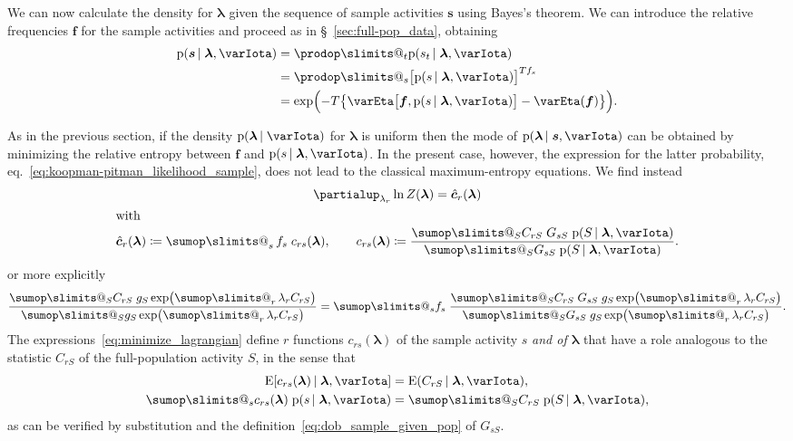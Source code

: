 \documentclass[\ifafour a4paper,12pt,\else a5paper,10pt,\fi%
onecolumn,oneside,article,%
british%
]{memoir}
\makeatletter
\theoremstyle{remark}
\theoremstyle{innote}
\def\sum{\DOTSI\sumop\slimits@}
\def\prod{\DOTSI\prodop\slimits@}
\newcommand*{\de}{\partialup}%
\newcommand*{\defd}{\coloneqq}
\newcommand*{\pf}{\mathrm{p}}%
\newcommand*{\E}{\mathrm{E}}
\renewcommand*{\|}{\nonscript\,\vert\nonscript\;\mathopen{}}
\newcommand*{\sect}{\S}%
\newcommand*{\eqn}{eq.}%
\newcommand*{\tsum}{\mathop{\textstyle\sum}\nolimits}
\newcommand*{\yS}{S}
\newcommand*{\ys}{s}
\newcommand*{\yst}{\bm{\ys}}
\newcommand*{\yll}{\lambda}
\newcommand*{\yl}{\bm{\lambda}}
\newcommand*{\yg}{g}
\newcommand*{\yI}{\varIota}
\newcommand*{\yf}{\bm{f}}
\newcommand*{\yH}{\varEta}
\newcommand*{\yccs}{\Hat{\bm{c}}}
\makeatother
\begin{document}
We can now calculate the density for $\yl$ given the sequence of sample
activities $\yst$ using Bayes's theorem. We can introduce the relative
frequencies $\yf$ for the sample activities and proceed as in
\sect~\ref{sec:full-pop_data}, obtaining
\begin{equation}
  \label{eq:to_maxent_sample}
  \begin{split}
  \pf(\yst \| \yl, \yI) &= \prod_{t} \pf(\ys_{t} \| \yl, \yI)
    \\ &=
    \prod_{\ys}\bigl[ \pf(\ys \| \yl, \yI) \bigr]^{T f_{\ys}}
    \\ &=
    \exp\Bigl(-T\bigl\{
    \yH\bigl[\yf, \pf(\ys \| \yl, \yI)\bigr]
    -\yH(\yf)\bigr\}\Bigr).
\end{split}
\end{equation}

As in the previous section, if the density $\pf(\yl \| \yI)$ for $\yl$ is
uniform then the mode of $\pf(\yl \| \yst, \yI)$ can be obtained by
minimizing the relative entropy between $\yf$ and $\pf(\ys \| \yl, \yI)$.
In the present case, however, the expression for the latter probability,
\eqn~\eqref{eq:koopman-pitman_likelihood_sample}, does not lead to the
classical maximum-entropy equations. We find instead
\begin{subequations}
  \label{eq:minimize_lagrangian}
  \begin{gather}
    \de_{\yll_{r}}\ln Z(\yl) = \yccs_{r}(\yl)
    \\
    \shortintertext{with}
   \yccs_{r}(\yl) \defd
   \tsum_{\ys} f_{\ys}\; c_{r\ys}(\yl),
   \qquad
    c_{r\ys}(\yl) \defd \frac{
      \sum_{\yS} C_{r\yS}\; G_{\ys\yS}\;\pf(\yS \| \yl, \yI)
    }{
      \sum_{\yS} G_{\ys\yS}\;\pf(\yS \| \yl, \yI)
    }.
  \end{gather}
\end{subequations}
or more explicitly
\begin{equation}
  \label{eq:explicit_eqn_lambda_sample}
  \frac{\sum_{\yS} C_{r\yS}\;\yg_{\yS}
    \exp\bigl( \tsum_{r} \yll_{r} C_{r\yS} \bigr)}{
    \sum_{\yS} \yg_{\yS}
    \exp\bigl( \tsum_{r} \yll_{r} C_{r\yS} \bigr)
  }
  =
  \sum_{\ys} f_{\ys}\;
  \frac{
    \sum_{\yS} C_{r\yS}\; G_{\ys\yS}\;\yg_{\yS}
    \exp\bigl( \tsum_{r} \yll_{r} C_{r\yS} \bigr)
  }{
    \sum_{\yS} G_{\ys\yS}\;\yg_{\yS}
    \exp\bigl( \tsum_{r} \yll_{r} C_{r\yS} \bigr)
  }.
\end{equation}
The expressions~\eqref{eq:minimize_lagrangian} define $r$ functions
$c_{r\ys}(\yl)$ of the sample activity $\ys$ \emph{and of $\yl$} that have
a role analogous to the statistic $C_{r\yS}$ of the full-population
activity $\yS$, in the sense that
\begin{equation}
  \label{eq:statistics_for_sample}
  \begin{split}
  \E[c_{r\ys}(\yl) \| \yl, \yI]
  &=  \E(C_{r\yS} \| \yl, \yI),
  \\
  \sum_{\ys} c_{r\ys}(\yl)\; \pf(\ys \| \yl, \yI)
 &= \sum_{\yS} C_{r\yS}\; \pf(\yS \| \yl, \yI),
\end{split}
\end{equation}
as can be verified by substitution and the
definition~\eqref{eq:dob_sample_given_pop} of $G_{\ys\yS}$.
\end{document}
